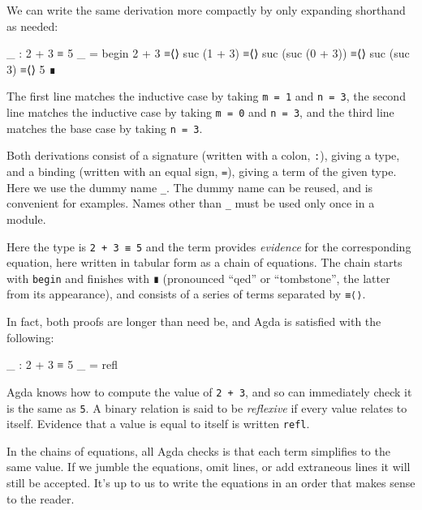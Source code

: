 We can write the same derivation more compactly by only expanding
shorthand as needed:

\begin{fence}
\begin{code}
_ : 2 + 3 ≡ 5
_ =
  begin
    2 + 3
  ≡⟨⟩
    suc (1 + 3)
  ≡⟨⟩
    suc (suc (0 + 3))
  ≡⟨⟩
    suc (suc 3)
  ≡⟨⟩
    5
  ∎
\end{code}
\end{fence}

The first line matches the inductive case by taking \texttt{m\ =\ 1} and
\texttt{n\ =\ 3}, the second line matches the inductive case by taking
\texttt{m\ =\ 0} and \texttt{n\ =\ 3}, and the third line matches the
base case by taking \texttt{n\ =\ 3}.

Both derivations consist of a signature (written with a colon,
\texttt{:}), giving a type, and a binding (written with an equal sign,
\texttt{=}), giving a term of the given type. Here we use the dummy name
\texttt{\_}. The dummy name can be reused, and is convenient for
examples. Names other than \texttt{\_} must be used only once in a
module.

Here the type is \texttt{2\ +\ 3\ ≡\ 5} and the term provides
\emph{evidence} for the corresponding equation, here written in tabular
form as a chain of equations. The chain starts with \texttt{begin} and
finishes with \texttt{∎} (pronounced ``qed'' or ``tombstone'', the
latter from its appearance), and consists of a series of terms separated
by \texttt{≡⟨⟩}.

In fact, both proofs are longer than need be, and Agda is satisfied with
the following:

\begin{fence}
\begin{code}
_ : 2 + 3 ≡ 5
_ = refl
\end{code}
\end{fence}

Agda knows how to compute the value of \texttt{2\ +\ 3}, and so can
immediately check it is the same as \texttt{5}. A binary relation is
said to be \emph{reflexive} if every value relates to itself. Evidence
that a value is equal to itself is written \texttt{refl}.

In the chains of equations, all Agda checks is that each term simplifies
to the same value. If we jumble the equations, omit lines, or add
extraneous lines it will still be accepted. It's up to us to write the
equations in an order that makes sense to the reader.

